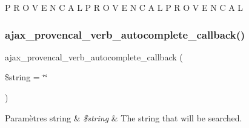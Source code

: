 P R O V E N C A L P R O V E N C A L P R O V E N C A L \hypertarget{php_2conjoc__provencal__webForm_8inc_a2f2da1c5cc327e80252b73dd250aa363}{}\label{php_2conjoc__provencal__webForm_8inc_a2f2da1c5cc327e80252b73dd250aa363} 
\subsubsection{\texorpdfstring{ajax\+\_\+provencal\+\_\+verb\+\_\+autocomplete\+\_\+callback()}{ajax\_provencal\_verb\_autocomplete\_callback()}}
{\footnotesize\ttfamily ajax\+\_\+provencal\+\_\+verb\+\_\+autocomplete\+\_\+callback (\begin{DoxyParamCaption}\item[{}]{\$string = {\ttfamily \char`\"{}\char`\"{}} }\end{DoxyParamCaption})}


\begin{DoxyParams}[1]{Paramètres}
string & {\em \$string} & The string that will be searched. \\
\hline
\end{DoxyParams}
